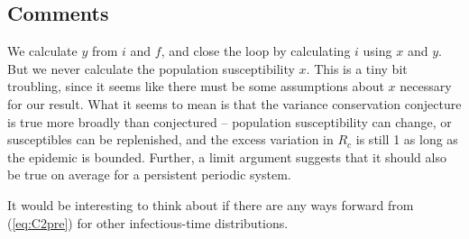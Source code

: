 \documentclass[11pt]{article}
\newcommand{\eqref}[1]{(\ref{eq:#1})}
\begin{document}
\subsection*{Comments}

We calculate $y$ from $i$ and $f$, and close the loop by calculating $i$ using $x$ and $y$. But we never calculate the population susceptibility $x$. This is a tiny bit troubling, since it seems like there must be some assumptions about $x$ necessary for our result. What it seems to mean is that the variance conservation conjecture is true more broadly than conjectured – population susceptibility can change, or susceptibles can be replenished, and the excess variation in $R_c$ is still 1 as long as the epidemic is bounded. Further, a limit argument suggests that it should also be true on average for a persistent periodic system.

It would be interesting to think about if there are any ways forward from \eqref{C2pre} for other infectious-time distributions.
\end{document}
